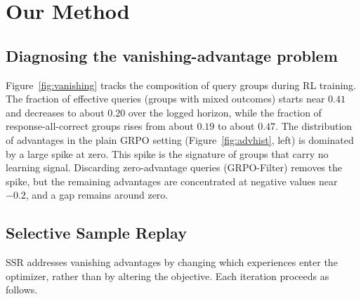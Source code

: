 \documentclass{article}
\begin{document}
\section{Our Method}

\subsection{Diagnosing the vanishing-advantage problem}

Figure~\ref{fig:vanishing} tracks the composition of query groups during RL training. The fraction of effective queries (groups with mixed outcomes) starts near $0.41$ and decreases to about $0.20$ over the logged horizon, while the fraction of response-all-correct groups rises from about $0.19$ to about $0.47$. The distribution of advantages in the plain GRPO setting (Figure~\ref{fig:advhist}, left) is dominated by a large spike at zero. This spike is the signature of groups that carry no learning signal. Discarding zero-advantage queries (GRPO-Filter) removes the spike, but the remaining advantages are concentrated at negative values near $-0.2$, and a gap remains around zero.

\subsection{Selective Sample Replay}

SSR addresses vanishing advantages by changing which experiences enter the optimizer, rather than by altering the objective. Each iteration proceeds as follows.
\end{document}
